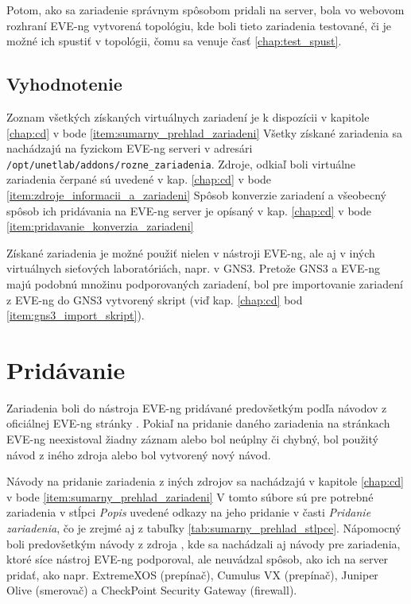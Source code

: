 Potom, ako sa zariadenie správnym spôsobom pridali na server, bola vo webovom rozhraní EVE-ng vytvorená topológiu, kde boli tieto zariadenia testované, či je možné ich spustiť v topológii, čomu sa venuje časť \ref{chap:test_spust}.





\subsection{Vyhodnotenie}

Zoznam všetkých získaných virtuálnych zariadení je k dispozícii v kapitole \ref{chap:cd} v bode \ref{item:sumarny_prehlad_zariadeni} Všetky získané zariadenia sa nachádzajú na fyzickom EVE-ng serveri v adresári \\
\texttt{/opt/unetlab/addons/rozne\_zariadenia}. Zdroje, odkiaľ boli virtuálne zariadenia čerpané sú uvedené v kap. \ref{chap:cd} v bode \ref{item:zdroje_informacii_a_zariadeni} Spôsob konverzie zariadení a všeobecný spôsob ich pridávania na EVE-ng server je opísaný v kap. \ref{chap:cd} v bode \ref{item:pridavanie_konverzia_zariadeni}

Získané zariadenia je možné použiť nielen v nástroji EVE-ng, ale aj v iných virtuálnych sieťových laboratóriách, napr. v GNS3. Pretože GNS3 a EVE-ng majú podobnú množinu podporovaných zariadení, bol pre importovanie zariadení z EVE-ng do GNS3 vytvorený skript (viď kap. \ref{chap:cd} bod \ref{item:gns3_import_skript}).






\section{Pridávanie}
\label{chap:pridavanie_zariadeni}


Zariadenia boli do nástroja EVE-ng pridávané predovšetkým podľa návodov z oficiálnej EVE-ng stránky \cite{eve_ng_howtos}. Pokiaľ na pridanie daného zariadenia na stránkach EVE-ng neexistoval žiadny záznam alebo bol neúplny či chybný, bol použitý návod z iného zdroja alebo bol vytvorený nový návod.

Návody na pridanie zariadenia z iných zdrojov sa nachádzajú v kapitole \ref{chap:cd} v bode \ref{item:sumarny_prehlad_zariadeni} V tomto súbore sú pre potrebné zariadenia v stĺpci \emph{Popis} uvedené odkazy na jeho pridanie v časti \emph{Pridanie zariadenia}, čo je zrejmé aj z tabuľky \ref{tab:sumarny_prehlad_stlpce}. Nápomocný boli predovšetkým návody z zdroja \cite{dalsie_navody_eve_ng}, kde sa nachádzali aj návody pre zariadenia, ktoré síce nástroj EVE-ng podporoval, ale neuvádzal spôsob, ako ich na server pridať, ako napr. ExtremeXOS (prepínač), Cumulus VX (prepínač), Juniper Olive (smerovač) a CheckPoint Security Gateway (firewall).

